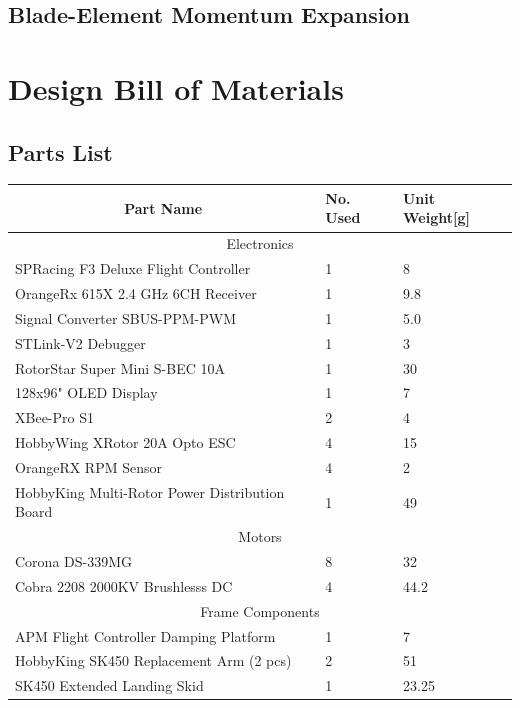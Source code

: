 \section{Blade-Element Momentum Expansion}
\label{app:equations.bem} %
\chapter{Design Bill of Materials}
\label{app:bom}
\section{Parts List}
\begin{table}[htbp]
\centering
\begin{tabularx}{\textwidth}{|X|l|l|}
\hline
\multicolumn{1}{|c|}{Part Name} & No. Used & Unit Weight[g]\\ \hline
\multicolumn{3}{|c|}{Electronics}\\ \hline
SPRacing F3 Deluxe Flight Controller & 1 & 8\\ \hline
OrangeRx 615X 2.4 GHz 6CH Receiver & 1 & 9.8\\ \hline
Signal Converter SBUS-PPM-PWM & 1 & 5.0\\ \hline 
STLink-V2 Debugger & 1 & 3\\ \hline
RotorStar Super Mini S-BEC 10A & 1 & 30\\ \hline
128x96" OLED Display & 1 & 7 \\ \hline
XBee-Pro S1 & 2 & 4 \\ \hline
HobbyWing XRotor 20A Opto ESC & 4 & 15\\ \hline
OrangeRX RPM Sensor & 4 & 2\\ \hline
HobbyKing Multi-Rotor Power Distribution Board & 1 & 49\\ \hline
\multicolumn{3}{|c|}{Motors}\\ \hline
Corona DS-339MG & 8 & 32\\ \hline
Cobra 2208 2000KV Brushlesss DC & 4 & 44.2\\ \hline
\multicolumn{3}{|c|}{Frame Components}\\ \hline
APM Flight Controller Damping Platform & 1 & 7\\ \hline
HobbyKing SK450 Replacement Arm (2 pcs) & 2 & 51\\ \hline
SK450 Extended Landing Skid & 1 & 23.25\\ \hline

\end{tabularx}
\end{table}
